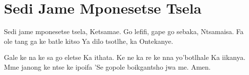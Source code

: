 \starttocol
\chapter{Sedi Jame Mponesetse Tsela}
\nexttocol
\hfill{\it }
\stoptocol
\starttocol
\startlines
{\sc Sedi} jame mponesetse tsela,
Ketsamae.
Go lefifi, gape go sebaka,
Ntsamaisa.
Fa ole tang ga ke batle kitso
Ya dilo tsotlhe, ka Ontekanye.

Gale ke na ke sa go eletse
Ka ithata.
Ke ne ka re ke nna yo'botlhale
Ka iikanya.
Mme janong ke ntse ke ipoifa
'Se gopole boikgantsho jwa me.  
      \hfill Amen.~~~~~~~~~

\stoplines
\nexttocol

\stoptocol
